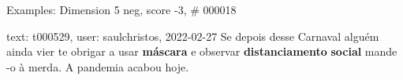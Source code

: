 \begin{frame}{Examples: Dimension 5 neg, score -3, \# 000018}
\footnotesize
\begin{alertblock}{text: t000529, user: saulchristos, 2022-02-27}
Se depois desse Carnaval alguém ainda vier te obrigar a usar \textbf{máscara} e 
observar \textbf{distanciamento} \textbf{social} mande -o à merda. A pandemia 
acabou hoje. 
\end{alertblock}
\end{frame}
